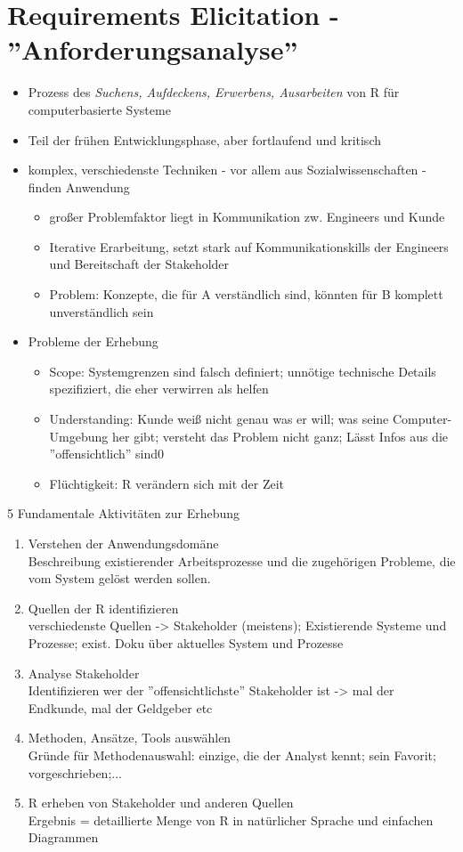 \section{Requirements Elicitation - ''Anforderungsanalyse''}
\begin{itemize}
	\item Prozess des \textit{Suchens, Aufdeckens, Erwerbens, Ausarbeiten} von R für computerbasierte Systeme
	\item Teil der frühen Entwicklungsphase, aber fortlaufend und kritisch
	\item komplex, verschiedenste Techniken - vor allem aus Sozialwissenschaften - finden Anwendung
	\begin{itemize}
		\item großer Problemfaktor liegt in Kommunikation zw. Engineers und Kunde
		\item Iterative Erarbeitung, setzt stark auf Kommunikationskills der Engineers und Bereitschaft der Stakeholder
		\item Problem: Konzepte, die für A verständlich sind, könnten für B komplett unverständlich sein
	\end{itemize}
	\item Probleme der Erhebung
	\begin{itemize}
		\item Scope: Systemgrenzen sind falsch definiert; unnötige technische Details spezifiziert, die eher verwirren als helfen
		\item Understanding: Kunde weiß nicht genau was er will; was seine Computer-Umgebung her gibt; versteht das Problem nicht ganz; Lässt Infos aus die ''offensichtlich'' sind0
		\item Flüchtigkeit: R verändern sich mit der Zeit
	\end{itemize}
\end{itemize}
5 Fundamentale Aktivitäten zur Erhebung
\begin{enumerate}
	\item Verstehen der Anwendungsdomäne\\
	Beschreibung existierender Arbeitsprozesse und die zugehörigen Probleme, die vom System gelöst werden sollen.
	\item Quellen der R identifizieren\\
	verschiedenste Quellen -> Stakeholder (meistens); Existierende Systeme und Prozesse; exist. Doku über aktuelles System und Prozesse
	\item Analyse Stakeholder\\
	Identifizieren wer der ''offensichtlichste'' Stakeholder ist -> mal der Endkunde, mal der Geldgeber etc
	\item Methoden, Ansätze, Tools auswählen\\
	Gründe für Methodenauswahl: einzige, die der Analyst kennt; sein Favorit; vorgeschrieben;...
	\item R erheben von Stakeholder und anderen Quellen\\
	Ergebnis = detaillierte Menge von R in natürlicher Sprache und einfachen Diagrammen
\end{enumerate}
